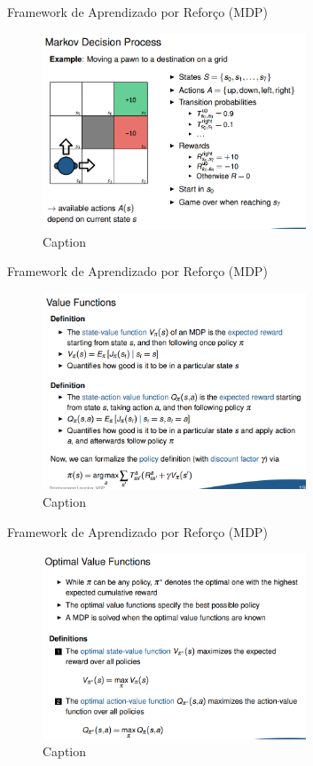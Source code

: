 \begin{frame}{Framework de Aprendizado por Reforço (MDP)}
    \begin{figure}
        \centering
        \includegraphics[width=0.7\textwidth]{img/exMdp.png}
        \caption{Caption}
        \label{fig:my_label}
    \end{figure}
\end{frame}

\begin{frame}{Framework de Aprendizado por Reforço (MDP)}
    \begin{figure}
        \centering
        \includegraphics[width=0.7\textwidth]{img/valueFunctions.png}
        \caption{Caption}
        \label{fig:my_label}
    \end{figure}
\end{frame}

\begin{frame}{Framework de Aprendizado por Reforço (MDP)}
    \begin{figure}
        \centering
        \includegraphics[width=0.7\textwidth]{img/optimal_value_functions.png}
        \caption{Caption}
        \label{fig:my_label}
    \end{figure}
\end{frame}

